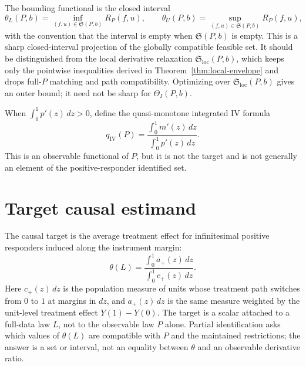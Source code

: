 \documentclass[11pt]{article}
\theoremstyle{definition}
\theoremstyle{plain}
\theoremstyle{remark}
\begin{document}
The bounding functional is the closed interval
\[
\theta_L(P,b)=\inf_{(f,u)\in\mathfrak S(P,b)} R_P(f,u),
\qquad
\theta_U(P,b)=\sup_{(f,u)\in\mathfrak S(P,b)} R_P(f,u),
\]
with the convention that the interval is empty when \(\mathfrak S(P,b)\) is
empty.  This is a sharp closed-interval projection of the globally compatible
feasible set.  It should be distinguished from the local derivative relaxation
\(\mathfrak S_{\mathrm{loc}}(P,b)\), which keeps only the pointwise inequalities
derived in Theorem~\ref{thm:local-envelope} and drops full-\(P\) matching
and path compatibility.  Optimizing over \(\mathfrak S_{\mathrm{loc}}(P,b)\)
gives an outer bound; it need not be sharp for \(\Theta_I(P,b)\).

When \(\int_0^1 p'(z)\,dz>0\), define the quasi-monotone integrated IV formula
\[
q_{\mathrm{IV}}(P)=
\frac{\int_0^1 m'(z)\,dz}{\int_0^1 p'(z)\,dz}.
\]
This is an observable functional of \(P\), but it is not the target and is not
generally an element of the positive-responder identified set.

\section{Target causal estimand}
The causal target is the average treatment effect for infinitesimal positive
responders induced along the instrument margin:
\[
\theta(L)=
\frac{\int_0^1 a_+(z)\,dz}
     {\int_0^1 c_+(z)\,dz}.
\]
Here \(c_+(z)\,dz\) is the population measure of units whose treatment path
switches from \(0\) to \(1\) at margins in \(dz\), and \(a_+(z)\,dz\) is the
same measure weighted by the unit-level treatment effect \(Y(1)-Y(0)\).  The
target is a scalar attached to a full-data law \(L\), not to the observable law
\(P\) alone.  Partial identification asks which values of \(\theta(L)\) are
compatible with \(P\) and the maintained restrictions; the answer is a set or
interval, not an equality between \(\theta\) and an observable derivative ratio.
\end{document}
